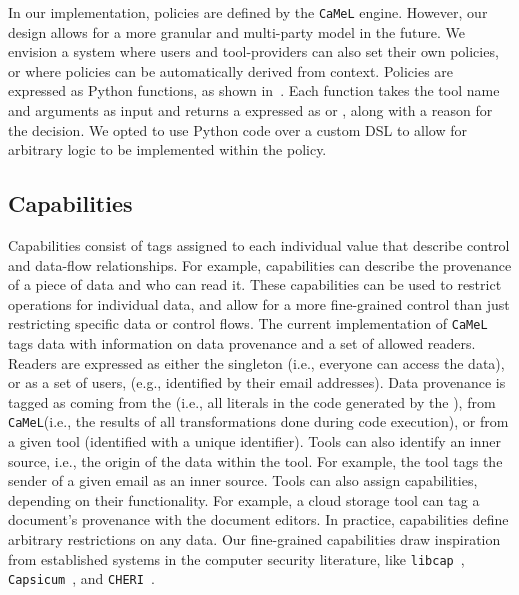 \documentclass[11pt, a4paper, logo, copyright]{googledeepmind}
\newcommand{\sysname}{\texttt{CaMeL}\xspace}
\begin{document}
In our implementation, policies are defined by the \sysname{} engine. However, our design allows for a more granular and multi-party model in the future. We envision a system where users and tool-providers can also set their own policies, or where policies can be automatically derived from context. Policies are expressed as Python functions, as shown in~. Each function takes the tool name and arguments as input and returns a  expressed as  or , along with a reason for the decision. We opted to use Python code over a custom DSL to allow for arbitrary logic to be implemented within the policy.

\subsection{Capabilities}

Capabilities consist of tags assigned to each individual value that describe control and data-flow relationships. For example, capabilities can describe the provenance of a piece of data and who can read it. These capabilities can be used to restrict operations for individual data, and allow for a more fine-grained control than just restricting specific data or control flows. The current implementation of \sysname{} tags data with information on data provenance and a set of allowed readers. Readers are expressed as either the  singleton (i.e., everyone can access the data), or as a set of users, (e.g., identified by their email addresses). Data provenance is tagged as coming from the  (i.e., all literals in the code generated by the \pllm), from \sysname (i.e., the results of all transformations done during code execution), or from a given tool (identified with a unique identifier). Tools can also identify an inner source, i.e., the origin of the data within the tool. For example, the  tool tags the sender of a given email as an inner source. Tools can also assign capabilities, depending on their functionality. For example, a cloud storage tool can tag a document's provenance with the document editors. In practice, capabilities define arbitrary restrictions on any data. Our fine-grained capabilities draw inspiration from established systems in the computer security literature, like \texttt{libcap}~\citep{libcap}, \texttt{Capsicum}~\citep{watson2010capsicum}, and \texttt{CHERI}~\citep{woodruff2014cheri,watson2015cheri}.
\end{document}
